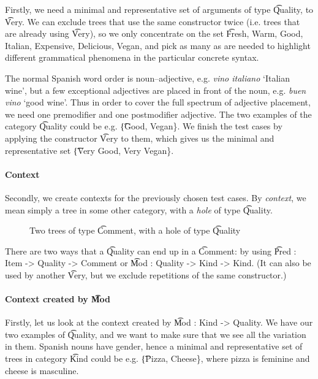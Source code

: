 Firstly, we need a minimal and representative set of arguments of type
\t{Quality}, to \t{Very}. We can exclude trees that use the same
constructor twice (i.e. trees that are already using \t{Very}), so we
only concentrate on the set \t{Fresh, Warm, Good, Italian, Expensive,
  Delicious, Vegan}, and pick as many as are needed to highlight
different grammatical phenomena in the particular concrete syntax.

The normal Spanish word order is noun--adjective, e.g. \emph{vino
  italiano} `Italian wine', but a few exceptional adjectives are
placed in front of the noun, e.g. \emph{buen vino} `good wine'. Thus
in order to cover the full spectrum of adjective placement, we need
one premodifier and one postmodifier adjective. The two examples of
the category \t{Quality} could be e.g. \t{\{Good, Vegan\}}. We finish
the test cases by applying the constructor \t{Very} to them, which
gives us the minimal and representative set \t{\{Very Good, Very
  Vegan\}}.


\paragraph{Context} 

Secondly, we create contexts for the previously chosen test cases. By
\emph{context}, we mean simply a tree in some other category, with a
\emph{hole} of type \t{Quality}. 


\begin{figure}[h]

  \centering
 \caption{Two trees of type \t{Comment}, with a hole of type \t{Quality}}
\end{figure}

There are two ways that a \t{Quality} can end up in a \t{Comment}: by
using \t{Pred : Item -> Quality -> Comment} or \t{Mod : Quality ->
  Kind -> Kind}. (It can also be used by another \t{Very}, but we
exclude repetitions of the same constructor.)

\paragraph{Context created by \t{Mod}} Firstly, let us look at the context created by \t{Mod : Kind -> Quality}.
We have our two examples of \t{Quality}, and we want to make sure that we see all the variation in them.
Spanish nouns have gender, hence a minimal and representative set of
trees in category \t{Kind} could be e.g. \t{\{Pizza, Cheese\}}, where
pizza is feminine and cheese is masculine.

